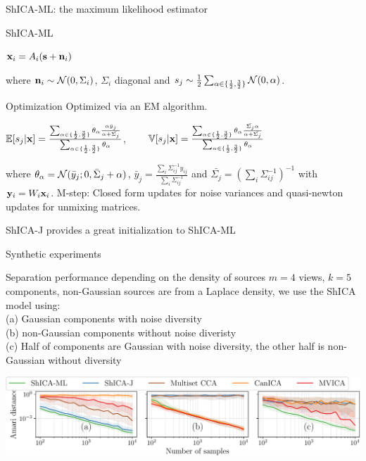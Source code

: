 \documentclass[bigger]{beamer}
\begin{document}
\begin{frame}{ShICA-ML: the maximum likelihood estimator}
  \begin{block}{ShICA-ML}
      \centerline{$\mathbf{x}_i = A_i (\mathbf{s} + \mathbf{n}_i)$} where $\mathbf{n}_i \sim \mathcal{N}(0, \Sigma_i)$, $\Sigma_i$ diagonal and $s_j
  \sim \frac12 \sum_{\alpha \in \{ \frac12, \frac32 \}} \mathcal{N}(0, \alpha)$.
  \end{block}

  \begin{block}{Optimization}
    Optimized via an EM algorithm.
    \vspace{-1em}
    \begin{center}
      $\mathbb{E}[s_j | \mathbf{x}] = \frac{\sum_{\alpha \in \{\frac12, \frac32\}}
        \theta_{\alpha} \frac{\alpha \bar{y}_{j}}{\alpha +
          \bar{\Sigma_{j}}}}{\sum_{\alpha \in \{ \frac12, \frac32 \}}
        \theta_{\alpha}} $, $\enspace \enspace \enspace$
      $ \mathbb{V}[s_j | \mathbf{x}] = \frac{\sum_{\alpha \in \{\frac12, \frac32\}} \theta_{\alpha} \frac{\bar{\Sigma_{j}}\alpha}{\alpha + \bar{\Sigma_{j}}}}{\sum_{\alpha \in \{ \frac12, \frac32 \}} \theta_{\alpha}}$  
    \end{center}
    \vspace{-1em}
    where $\theta_{\alpha} = \mathcal{N}(\bar{y}_{j}; 0 , \bar{\Sigma}_{j} + \alpha)$, 
    $\bar{y}_j = \frac{\sum_i \Sigma_{ij}^{-1} y_{ij}}{ \sum_i
      \Sigma_{ij}^{-1}}$ and $\bar{\Sigma_{j}} = (\sum_i
    \Sigma_{ij}^{-1})^{-1}$ with $\mathbf{y}_i = W_i \mathbf{x}_i$.
    M-step: Closed form updates for noise variances and quasi-newton updates for
    unmixing matrices.
  \end{block}
  ShICA-J provides a great initialization to ShICA-ML
\end{frame}

\begin{frame}{Synthetic experiments}
  \begin{block}{Separation performance depending on the density of sources}
  $m=4$ views, $k=5$ components, non-Gaussian sources are from a Laplace
  density, we use the ShICA model using: \\
  (a) Gaussian components with noise diversity \\
  (b) non-Gaussian components without noise diveristy \\
  (c) Half of components are Gaussian with noise diversity, the other half is
  non-Gaussian without diversity
\end{block}
  \begin{center}
    \includegraphics[width=\textwidth]{./figures/identifiability.pdf}
  \end{center}
\end{frame}
\end{document}
